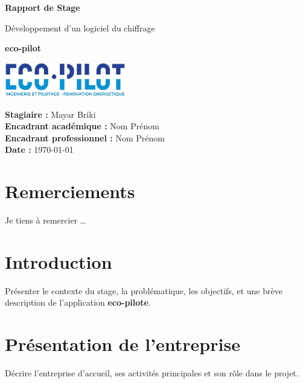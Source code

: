 \documentclass[12pt,a4paper]{report}
\begin{document}
\begin{titlepage}
    \centering
    \vspace*{2cm}
    {\Huge \textbf{Rapport de Stage} \par}
    \vspace{1.5cm}
    {\LARGE Développement d’un logiciel du chiffrage\par}
    \vspace{0.5cm}
    {\Large \textbf{eco-pilot} \par}
    \vspace{2cm}
    \includegraphics[width=0.4\textwidth]{logo.png}\par %
    \vfill
    \begin{flushright}
        \textbf{Stagiaire :} Mayar Briki \\
        \textbf{Encadrant académique :} Nom Prénom \\
        \textbf{Encadrant professionnel :} Nom Prénom \\
        \textbf{Date :} \today
    \end{flushright}
\end{titlepage}

\chapter*{Remerciements}
Je tiens à remercier \dots

\tableofcontents
\clearpage

\chapter{Introduction}
Présenter le contexte du stage, la problématique, les objectifs, et une brève description de l’application \textbf{eco-pilote}.  

\chapter{Présentation de l’entreprise}
Décrire l’entreprise d’accueil, ses activités principales et son rôle dans le projet.  
\end{document}
